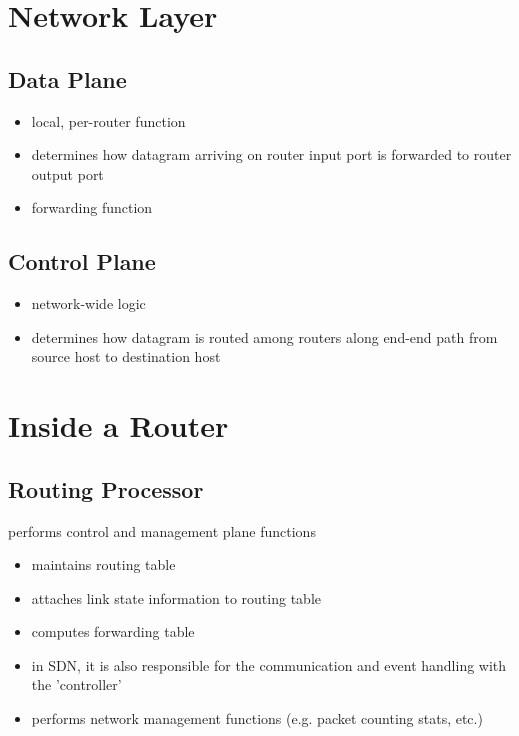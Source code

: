 \documentclass{article}
\begin{document}
	\section{Network Layer}
	
	\subsection{Data Plane}
	
	\begin{itemize}[noitemsep]
		\item local, per-router function
		\item determines how datagram arriving on router input port is forwarded to router output port
		\item forwarding function
	\end{itemize}
	
	\subsection{Control Plane}
	
	\begin{itemize}[noitemsep]
		\item network-wide logic
		\item determines how datagram is routed among routers along end-end path from source host to destination host
	\end{itemize}
	
	\section{Inside a Router}
	
	\subsection{Routing Processor}
	
	performs control and management plane functions
	
	\begin{itemize}[noitemsep]
		\item maintains routing table
		\item attaches link state information to routing table
		\item computes forwarding table
		\item in SDN, it is also responsible for the communication and event handling with the 'controller'
		\item performs network management functions (e.g. packet counting stats, etc.)
	\end{itemize}
	
\end{document}
